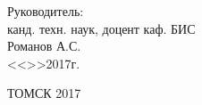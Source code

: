 \vfill

\begin{flushright}
\begin{minipage}{0.45\textwidth}
 \begin{flushleft}
  Руководитель: \\
  канд. техн. наук, доцент каф. БИС \\
  \underline{\hspace{3cm}} Романов А.С. \\
  <<\underline{\hspace{1cm}}>>\underline{\hspace{3cm}}2017г.\\
 \end{flushleft}
\end{minipage}
\end{flushright}

\vfill

\begin{center}
 ТОМСК 2017
\end{center}
